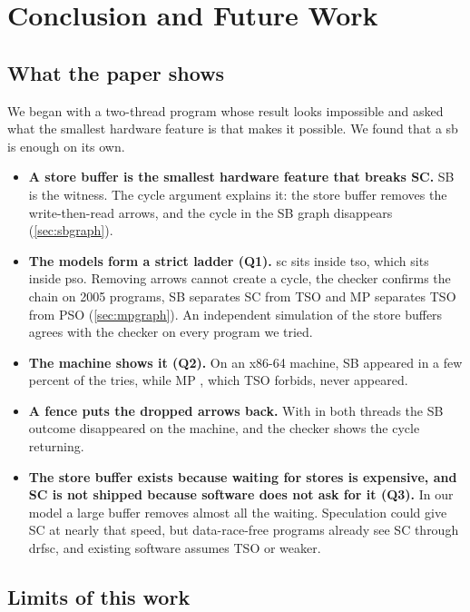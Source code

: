 \chapter{Conclusion and Future Work}
\label{ch:conclusion}

\section{What the paper shows}

We began with a two-thread program whose result looks impossible and asked what the smallest hardware feature is that makes it possible. We found that a \gls{sb} is enough on its own.

\begin{itemize}
\item \textbf{A store buffer is the smallest hardware feature that breaks SC.} SB  is the witness. The cycle argument explains it: the store buffer removes the write-then-read arrows, and the cycle in the SB graph disappears (\cref{sec:sbgraph}).
\item \textbf{The models form a strict ladder (Q1).} \gls{sc} sits inside \gls{tso}, which sits inside \gls{pso}. Removing arrows cannot create a cycle, the checker confirms the chain on 2005 programs, SB separates SC from TSO and MP separates TSO from PSO (\cref{sec:mpgraph}). An independent simulation of the store buffers agrees with the checker on every program we tried.
\item \textbf{The machine shows it (Q2).} On an x86-64 machine, SB  appeared in a few percent of the tries, while MP , which TSO forbids, never appeared.
\item \textbf{A fence puts the dropped arrows back.} With  in both threads the SB outcome disappeared on the machine, and the checker shows the cycle returning.
\item \textbf{The store buffer exists because waiting for stores is expensive, and SC is not shipped because software does not ask for it (Q3).} In our model a large buffer removes almost all the waiting. Speculation could give SC at nearly that speed, but data-race-free programs already see SC through \gls{drfsc}, and existing software assumes TSO or weaker.
\end{itemize}

\section{Limits of this work}

